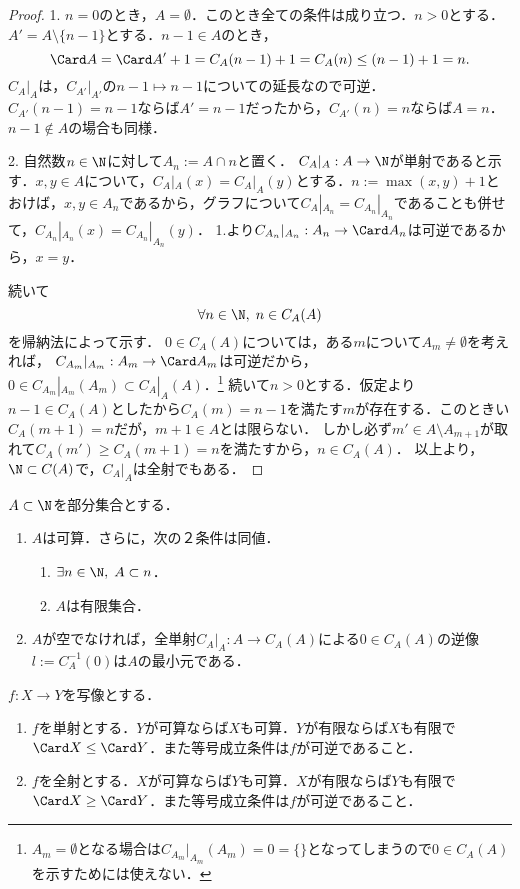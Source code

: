 \documentclass[uplatex,dvipdfmx]{jsreport}
\begin{document}
\begin{proof}
    1. $n=0$のとき，$A=\emptyset$．このとき全ての条件は成り立つ．$n>0$とする．
    $A'=A\setminus\{n-1\}$とする．$n-1\in A$のとき，
    \[ \Card A=\Card A'+1=C_A(n-1)+1=C_A(n)\le (n-1)+1=n. \]
    $C_A|_A$は，$C_{A'}|_{A'}$の$n-1\mapsto n-1$についての延長なので可逆．$C_{A'}(n-1)=n-1$ならば$A'=n-1$だったから，$C_{A'}(n)=n$ならば$A=n$．
    $n-1\notin A$の場合も同様．

    2. 自然数$n\in\N$に対して$A_n:=A\cap n$と置く．
    $C_A|_A:A\to\N$が単射であると示す．$x,y\in A$について，$C_A|_A(x)=C_A|_A(y)$とする．$n:=\max(x,y)+1$とおけば，$x,y\in A_n$であるから，グラフについて$C_A|_{A_n}=C_{A_n}|_{A_n}$であることも併せて，$C_{A_n}|_{A_n}(x)=C_{A_n}|_{A_n}(y)$．
    1.より$C_{A_n}|_{A_n}:A_n\to\Card A_n$は可逆であるから，$x=y$．

    続いて
    \[ \forall n\in\N,\;n\in C_A(A) \]
    を帰納法によって示す．
    $0\in C_A(A)$については，ある$m$について$A_m\ne\emptyset$を考えれば，
    $C_{A_m}|_{A_m}:A_m\to\Card A_m$は可逆だから，$0\in C_{A_m}|_{A_m}(A_m)\subset C_A|_A(A)$．\footnote{$A_m=\emptyset$となる場合は$C_{A_m}|_{A_m}(A_m)=0=\{\}$となってしまうので$0\in C_A(A)$を示すためには使えない．}
    続いて$n>0$とする．仮定より$n-1\in C_A(A)$としたから$C_A(m)=n-1$を満たす$m$が存在する．このときい$C_A(m+1)=n$だが，$m+1\in A$とは限らない．
    しかし必ず$m'\in A\setminus A_{m+1}$が取れて$C_A(m')\ge C_A(m+1)=n$を満たすから，$n\in C_A(A)$．
    以上より，$\N\subset C(A)$で，$C_A|_A$は全射でもある．
\end{proof}

\begin{corollary}
    $A\subset\N$を部分集合とする．
    \begin{enumerate}
        \item $A$は可算．さらに，次の２条件は同値．\begin{enumerate}[(1)]
            \item $\exists n\in\N,\;A\subset n$．
            \item $A$は有限集合．
        \end{enumerate}
        \item $A$が空でなければ，全単射$C_A|_A:A\to C_A(A)$による$0\in C_A(A)$の逆像$l:=C_A^{-1}(0)$は$A$の最小元である．
    \end{enumerate}
\end{corollary}

\begin{corollary}
    $f:X\to Y$を写像とする．
    \begin{enumerate}
        \item $f$を単射とする．$Y$が可算ならば$X$も可算．$Y$が有限ならば$X$も有限で$\Card X\le\Card Y$．また等号成立条件は$f$が可逆であること．
        \item $f$を全射とする．$X$が可算ならば$Y$も可算．$X$が有限ならば$Y$も有限で$\Card X\ge\Card Y$．また等号成立条件は$f$が可逆であること．
    \end{enumerate}
\end{corollary}
\end{document}
